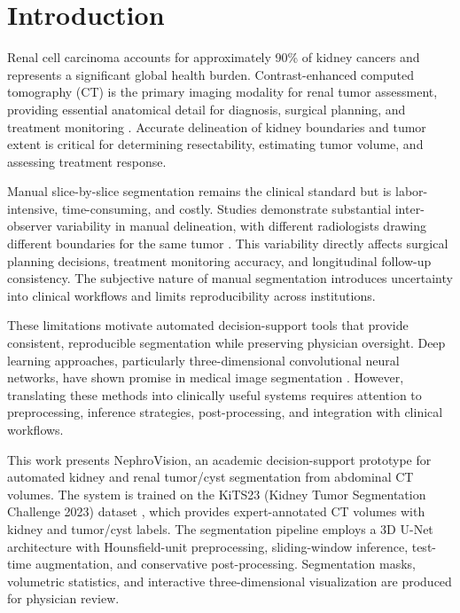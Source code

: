 \section{Introduction}

Renal cell carcinoma accounts for approximately 90\% of kidney cancers and represents a significant global health burden. Contrast-enhanced computed tomography (CT) is the primary imaging modality for renal tumor assessment, providing essential anatomical detail for diagnosis, surgical planning, and treatment monitoring \cite{ct_imaging_kidney}. Accurate delineation of kidney boundaries and tumor extent is critical for determining resectability, estimating tumor volume, and assessing treatment response.

Manual slice-by-slice segmentation remains the clinical standard but is labor-intensive, time-consuming, and costly. Studies demonstrate substantial inter-observer variability in manual delineation, with different radiologists drawing different boundaries for the same tumor \cite{interobserver_variability}. This variability directly affects surgical planning decisions, treatment monitoring accuracy, and longitudinal follow-up consistency. The subjective nature of manual segmentation introduces uncertainty into clinical workflows and limits reproducibility across institutions.

These limitations motivate automated decision-support tools that provide consistent, reproducible segmentation while preserving physician oversight. Deep learning approaches, particularly three-dimensional convolutional neural networks, have shown promise in medical image segmentation \cite{unet3d}. However, translating these methods into clinically useful systems requires attention to preprocessing, inference strategies, post-processing, and integration with clinical workflows.

This work presents NephroVision, an academic decision-support prototype for automated kidney and renal tumor/cyst segmentation from abdominal CT volumes. The system is trained on the KiTS23 (Kidney Tumor Segmentation Challenge 2023) dataset \cite{kits23}, which provides expert-annotated CT volumes with kidney and tumor/cyst labels. The segmentation pipeline employs a 3D U-Net architecture with Hounsfield-unit preprocessing, sliding-window inference, test-time augmentation, and conservative post-processing. Segmentation masks, volumetric statistics, and interactive three-dimensional visualization are produced for physician review.

